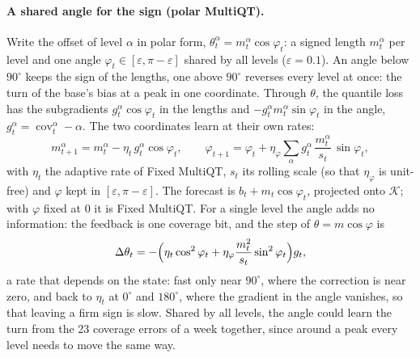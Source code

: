 \documentclass[11pt,a4paper]{article}
\newcommand{\K}{\mathcal{K}}
\DeclareMathOperator{\cov}{cov}
\theoremstyle{definition}
\theoremstyle{remark}
\begin{document}
\paragraph{A shared angle for the sign (polar MultiQT).} Write the offset of
level $\alpha$ in polar form, $\theta_t^\alpha=m_t^\alpha\cos\varphi_t$: a
signed length $m_t^\alpha$ per level and one angle
$\varphi_t\in[\varepsilon,\pi-\varepsilon]$ shared by all levels
($\varepsilon=0.1$). An angle below $90^\circ$ keeps the sign of the
lengths, one above $90^\circ$ reverses every level at once: the turn of the
base's bias at a peak in one coordinate. Through $\theta$, the quantile loss
has the subgradients $g_t^\alpha\cos\varphi_t$ in the lengths and
$-g_t^\alpha m_t^\alpha\sin\varphi_t$ in the angle, $g_t^\alpha=\cov_t^\alpha-\alpha$.
The two coordinates learn at their own rates:
\begin{equation}
 m_{t+1}^\alpha=m_t^\alpha-\eta_t\,g_t^\alpha\cos\varphi_t,\qquad
 \varphi_{t+1}=\varphi_t+\eta_\varphi\sum_{\alpha}g_t^\alpha\,\frac{m_t^\alpha}{s_t}\,\sin\varphi_t,
 \label{eq:polar-update}
\end{equation}
with $\eta_t$ the adaptive rate of Fixed MultiQT, $s_t$ its rolling scale
(so that $\eta_\varphi$ is unit-free) and $\varphi$ kept in
$[\varepsilon,\pi-\varepsilon]$. The forecast is $b_t+m_t\cos\varphi_t$,
projected onto $\K$; with $\varphi$ fixed at 0 it is Fixed MultiQT. For a
single level the angle adds no information: the feedback is one coverage
bit, and the step of $\theta=m\cos\varphi$ is
\begin{equation}
 \Delta\theta_t=-\Bigl(\eta_t\cos^2\varphi_t+\eta_\varphi\frac{m_t^2}{s_t}\sin^2\varphi_t\Bigr)g_t,
 \label{eq:polar-effective-rate}
\end{equation}
a rate that depends on the state: fast only near $90^\circ$, where the
correction is near zero, and back to $\eta_t$ at $0^\circ$ and $180^\circ$,
where the gradient in the angle vanishes, so that leaving a firm sign is
slow. Shared by all levels, the angle could learn the turn from the 23
coverage errors of a week together, since around a peak every level needs
to move the same way.
\end{document}
